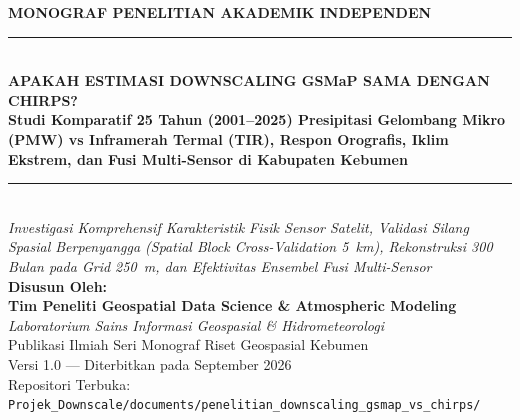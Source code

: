 \documentclass[11pt,a4paper,titlepage]{article}
\begin{document}
\hypersetup{pageanchor=false}
\begin{titlepage}
    \centering
    \vspace*{0.8cm}
    
    {\Large \textbf{MONOGRAF PENELITIAN AKADEMIK INDEPENDEN}}\\[0.6cm]
    \rule{\linewidth}{1.5pt}\\[0.4cm]
    {\LARGE \textbf{\color{navyblue} APAKAH ESTIMASI DOWNSCALING GSMaP SAMA DENGAN CHIRPS?}}\\[0.3cm]
    {\Large \textbf{Studi Komparatif 25 Tahun (2001--2025) Presipitasi Gelombang Mikro (PMW) vs Inframerah Termal (TIR), Respon Orografis, Iklim Ekstrem, dan Fusi Multi-Sensor di Kabupaten Kebumen}}\\[0.4cm]
    \rule{\linewidth}{1.5pt}\\[0.8cm]
    
    \textit{Investigasi Komprehensif Karakteristik Fisik Sensor Satelit, Validasi Silang Spasial Berpenyangga (\textit{Spatial Block Cross-Validation} 5~km), Rekonstruksi 300 Bulan pada Grid 250~m, dan Efektivitas Ensembel Fusi Multi-Sensor}\\[1.5cm]
    
    \textbf{Disusun Oleh:}\\[0.3cm]
    {\large \textbf{Tim Peneliti Geospatial Data Science \& Atmospheric Modeling}}\\[0.2cm]
    \textit{Laboratorium Sains Informasi Geospasial \& Hidrometeorologi}\\[2.2cm]
    
    \vfill
    {\small Publikasi Ilmiah Seri Monograf Riset Geospasial Kebumen}\\
    {\small Versi 1.0 --- Diterbitkan pada September 2026}\\
    {\small Repositori Terbuka: \texttt{Projek\_Downscale/documents/penelitian\_downscaling\_gsmap\_vs\_chirps/}}
\end{titlepage}

\hypersetup{pageanchor=true}
\end{document}

